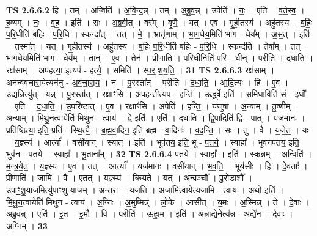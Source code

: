 \documentclass[17pt]{extarticle}
\begin{document}
                  \newline
                                \textbf{ TS 2.6.6.2} \newline
                  हि । तम् । अन्विति॑ । अ॒वि॒न्द॒न्न् । तम् । अ॒ब्रु॒व॒न्न् । उपेति॑ । नः॒ । एति॑ । व॒र्त॒स्व॒ । ह॒व्यम् । नः॒ । व॒ह॒ । इति॑ । सः । अ॒ब्र॒वी॒त् । वर᳚म् । वृ॒णै॒ । यत् । ए॒व । गृ॒ही॒तस्य॑ । अहु॑तस्य । ब॒हिः॒ प॒रि॒धीति॑ बहिः - प॒रि॒धि । स्कन्दा᳚त् । तत् । मे॒ । भ्रातृ॑णाम् । भा॒ग॒धेय॒मिति॑ भाग - धेय᳚म् । अ॒स॒त् । इति॑ । तस्मा᳚त् । यत् । गृ॒ही॒तस्य॑ । अहु॑तस्य । ब॒हिः॒ प॒रि॒धीति॑ बहिः - प॒रि॒धि । स्कन्द॑ति । तेषा᳚म् । तत् । भा॒ग॒धेय॒मिति॑ भाग - धेय᳚म् । तान् । ए॒व । तेन॑ । प्री॒णा॒ति॒ । प॒रि॒धीनिति॑ परि - धीन् । परीति॑ । द॒धा॒ति॒ । रक्ष॑साम् । अप॑हत्या॒ इत्यप॑ - ह॒त्यै॒ । समिति॑ । स्प॒र्॒.श॒य॒ति॒ । \textbf{  31} \newline
                  \newline
                                \textbf{ TS 2.6.6.3} \newline
                  रक्ष॑साम् । अन॑न्ववचारा॒येत्यन॑नु - अ॒व॒चा॒रा॒य॒ । न । पु॒रस्ता᳚त् । परीति॑ । द॒धा॒ति॒ । आ॒दि॒त्यः । हि । ए॒व । उ॒द्यन्नित्यु॑त् - यन्न् । पु॒रस्ता᳚त् । रक्षाꣳ॑सि । अ॒प॒हन्तीत्य॑प - हन्ति॑ । ऊ॒र्द्ध्वे इति॑ । स॒मिधा॒विति॑ सं - इधौ᳚ । एति॑ । द॒धा॒ति॒ । उ॒परि॑ष्टात् । ए॒व । रक्षाꣳ॑सि । अपेति॑ । ह॒न्ति॒ । यजु॑षा । अ॒न्याम् । तू॒ष्णीम् । अ॒न्याम् । मि॒थु॒न॒त्वायेति॑ मिथुन - त्वाय॑ । द्वे इति॑ । एति॑ । द॒धा॒ति॒ । द्वि॒पादिति॑ द्वि - पात् । यज॑मानः । प्रति॑ष्ठित्या॒ इति॒ प्रति॑ - स्थि॒त्यै॒ । ब्र॒ह्म॒वा॒दिन॒ इति॑ ब्रह्म - वा॒दिनः॑ । व॒द॒न्ति॒ । सः । तु । वै । य॒जे॒त॒ । यः । य॒ज्ञ्स्य॑ । आर्त्या᳚ । वसी॑यान् । स्यात् । इति॑ । भूप॑तय॒ इति॒ भू - प॒त॒ये॒ । स्वाहा᳚ । भुव॑नपतय॒ इति॒ भुव॑न - प॒त॒ये॒ । स्वाहा᳚ । भू॒ताना᳚म् । \textbf{  32} \newline
                  \newline
                                \textbf{ TS 2.6.6.4} \newline
                  पत॑ये । स्वाहा᳚ । इति॑ । स्क॒न्नम् । अन्विति॑ ।   म॒न्त्र॒ये॒त॒ । य॒ज्ञ्स्य॑ । ए॒व । तत् । आर्त्या᳚ । यज॑मानः । वसी॑यान् । भ॒व॒ति॒ । भूय॑सीः । हि । दे॒वताः᳚ । प्री॒णाति॑ । जा॒मि । वै । ए॒तत् । य॒ज्ञ्स्य॑ । क्रि॒य॒ते॒ । यत् । अ॒न्वञ्चौ᳚ । पु॒रो॒डाशौ᳚ । उ॒पाꣳ॒॒शु॒या॒जमित्यु॑पाꣳशु-या॒जम् । अ॒न्त॒रा । य॒ज॒ति॒ । अजा॑मित्वा॒येत्यजा॑मि - त्वा॒य॒ । अथो॒ इति॑ । मि॒थु॒न॒त्वायेति॑ मिथुन - त्वाय॑ । अ॒ग्निः । अ॒मुष्मिन्न्॑ । लो॒के । आसी᳚त् । य॒मः । अ॒स्मिन्न् । ते । दे॒वाः । अ॒ब्रु॒व॒न्न् । एति॑ । इ॒त॒ । इ॒मौ । वि । परीति॑ । ऊ॒हा॒म॒ । इति॑ । अ॒न्नाद्ये॒नेत्य॑न्न - अद्ये॑न ।   दे॒वाः । अ॒ग्निम् । \textbf{  33} \newline
\end{document}
